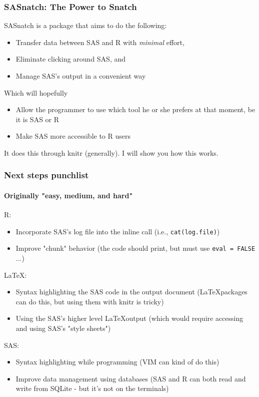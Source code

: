 \documentclass[xcolor=dvipsnames,gray,mathserif]{beamer}
\begin{document}
\begin{frame}
   \frametitle{SASnatch: The Power to Snatch}

   SASnatch is a package that aims to do the following:
   \begin{itemize}
      \item Transfer data between SAS and R with \emph{minimal} effort,
      \item Eliminate clicking around SAS, and
      \item Manage SAS's output in a convenient way
   \end{itemize}
   Which will hopefully
   \begin{itemize}
      \item Allow the programmer to use which tool he or she prefers at that moment, be it is SAS or R
      \item Make SAS more accessible to R users
   \end{itemize}

   It does this through knitr (generally). I will show you how this works.
\end{frame}

\begin{frame}[fragile]
   \frametitle{Next steps punchlist}
   \framesubtitle{Originally "easy, medium, and hard"}
   R:
   \begin{itemize}
      \item Incorporate SAS's log file into the inline call (i.e., \verb!cat(log.file)!)
      \item Improve "chunk" behavior (the code should print, but must use \verb!eval = FALSE! ...)
   \end{itemize}
   \LaTeX:
   \begin{itemize}
      \item Syntax highlighting the SAS code in the output document (\LaTeX packages can do this, but using them with knitr is tricky)
      \item Using the SAS's higher level \LaTeX output (which would require accessing and using SAS's "style sheets")
   \end{itemize}
   SAS:
   \begin{itemize}
      \item Syntax highlighting while programming (VIM can kind of do this)
      \item Improve data management using databases (SAS and R can both read and write from SQLite - but it's not on the terminals)
   \end{itemize}
\end{frame}
\end{document}
